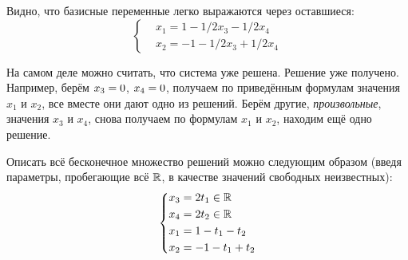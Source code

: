 \documentclass[a4paper,12pt]{article}
\begin{document}
  Видно, что базисные переменные легко выражаются через оставшиеся:
  \[
    \left\{
      \begin{aligned}
        &x_1 = 1 - 1/2 x_3 - 1/2 x_4\\
        &x_2 = -1 - 1/2 x_3 + 1/2 x_4
      \end{aligned}
    \right.
  \]

  На самом деле можно считать, что система уже решена.
  Решение уже получено.
  Например, берём $x_3 \hm= 0$, $x_4 \hm= 0$, получаем по приведённым формулам значения $x_1$ и $x_2$, все вместе они дают одно из решений.
  Берём другие, \emph{произвольные}, значения $x_3$ и $x_4$, снова получаем по формулам $x_1$ и $x_2$, находим ещё одно решение.

  Описать всё бесконечное множество решений можно следующим образом (введя параметры, пробегающие всё $\operatorname{\mathbb R}$, в качестве значений свободных неизвестных):
  \[
    \left\{
      \begin{aligned}
        &x_3 = 2 t_1 \in \operatorname{\mathbb R}\\
        &x_4 = 2 t_2 \in \operatorname{\mathbb R}\\
        &x_1 = 1 - t_1 - t_2\\
        &x_2 = -1 - t_1 + t_2
      \end{aligned}
    \right.
  \]
\end{document}

